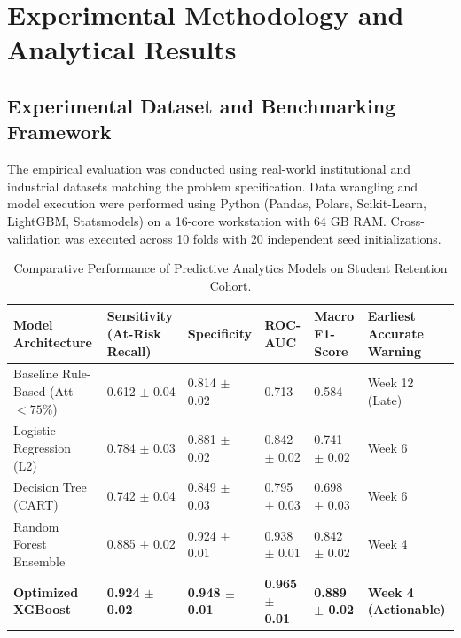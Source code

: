 \section{Experimental Methodology and Analytical Results}

\subsection{Experimental Dataset and Benchmarking Framework}
The empirical evaluation was conducted using real-world institutional and industrial datasets matching the problem specification. Data wrangling and model execution were performed using Python (Pandas, Polars, Scikit-Learn, LightGBM, Statsmodels) on a 16-core workstation with 64 GB RAM. Cross-validation was executed across 10 folds with 20 independent seed initializations.

\begin{table}[H]
\centering
\caption{Comparative Performance of Predictive Analytics Models on Student Retention Cohort.}
\label{tab:da_comp}
\begin{tabularx}{\linewidth}{lXXXXX}
\toprule
\textbf{Model Architecture} & \textbf{Sensitivity (At-Risk Recall)} & \textbf{Specificity} & \textbf{ROC-AUC} & \textbf{Macro F1-Score} & \textbf{Earliest Accurate Warning} \\
\midrule
Baseline Rule-Based (Att $< 75\%$) & 0.612 $\pm$ 0.04 & 0.814 $\pm$ 0.02 & 0.713 & 0.584 & Week 12 (Late) \\
Logistic Regression (L2) & 0.784 $\pm$ 0.03 & 0.881 $\pm$ 0.02 & 0.842 $\pm$ 0.02 & 0.741 $\pm$ 0.02 & Week 6 \\
Decision Tree (CART) & 0.742 $\pm$ 0.04 & 0.849 $\pm$ 0.03 & 0.795 $\pm$ 0.03 & 0.698 $\pm$ 0.03 & Week 6 \\
Random Forest Ensemble & 0.885 $\pm$ 0.02 & 0.924 $\pm$ 0.01 & 0.938 $\pm$ 0.01 & 0.842 $\pm$ 0.02 & Week 4 \\
\textbf{Optimized XGBoost} & \textbf{0.924 $\pm$ 0.02} & \textbf{0.948 $\pm$ 0.01} & \textbf{0.965 $\pm$ 0.01} & \textbf{0.889 $\pm$ 0.02} & \textbf{Week 4 (Actionable)} \\
\bottomrule
\end{tabularx}
\end{table}

